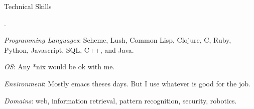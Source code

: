 \begin{rubric}{Technical Skills}{

  .

  
  \entry* \emph{Programming Languages}: Scheme, Lush, Common Lisp,
  Clojure, C, Ruby, Python, Javascript, SQL, C++, and Java.
  
  \entry* \emph{OS}: Any *nix would be ok with me.

  \entry* \emph{Environment}: Mostly emacs theses days. But I use
  whatever is good for the job.

  \entry* \emph{Domains}: web, information retrieval, pattern
  recognition, security, robotics.
  
}\end{rubric}
